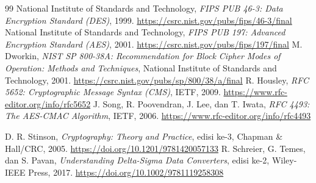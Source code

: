 \begin{thebibliography}{99}
   National Institute of Standards and Technology, \textit{FIPS PUB 46-3: Data Encryption Standard (DES)}, 1999. \url{https://csrc.nist.gov/pubs/fips/46-3/final}
   National Institute of Standards and Technology, \textit{FIPS PUB 197: Advanced Encryption Standard (AES)}, 2001. \url{https://csrc.nist.gov/pubs/fips/197/final}
   M. Dworkin, \textit{NIST SP 800-38A: Recommendation for Block Cipher Modes of Operation: Methods and Techniques}, National Institute of Standards and Technology, 2001. \url{https://csrc.nist.gov/pubs/sp/800/38/a/final}
   R. Housley, \textit{RFC 5652: Cryptographic Message Syntax (CMS)}, IETF, 2009. \url{https://www.rfc-editor.org/info/rfc5652}
   J. Song, R. Poovendran, J. Lee, dan T. Iwata, \textit{RFC 4493: The AES-CMAC Algorithm}, IETF, 2006. \url{https://www.rfc-editor.org/info/rfc4493}

   D. R. Stinson, \textit{Cryptography: Theory and Practice}, edisi ke-3, Chapman \& Hall/CRC, 2005. \url{https://doi.org/10.1201/9781420057133}
   R. Schreier, G. Temes, dan S. Pavan, \textit{Understanding Delta-Sigma Data Converters}, edisi ke-2, Wiley-IEEE Press, 2017. \url{https://doi.org/10.1002/9781119258308}


\end{thebibliography}
